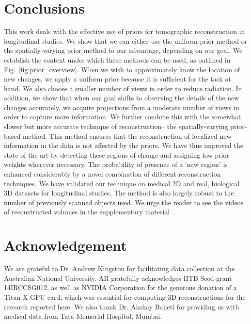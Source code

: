 \documentclass[journal]{IEEEtran}
\begin{document}
\section{Conclusions}
\label{sec:conclusions}
This work deals with the effective use of priors for tomographic
reconstruction in longitudinal studies. We show that we can either use
the uniform prior method or the spatially-varying prior method to our
advantage, depending on our goal. We establish the context under which
these methods can be used, as outlined in
Fig.~\ref{fig:prior_overview}. When we wish to approximately know the
location of new changes, we apply a uniform prior because it is
sufficient for the task at hand. We also choose a smaller number
of views in order to reduce radiation. In addition, we show that when
our goal shifts to observing the details of the new changes
accurately, we acquire projections from a moderate number of views in
order to capture more information. We further combine this with the
somewhat slower but more accurate technique of reconstruction-- the
spatially-varying prior-based method. This method ensures that the
reconstruction of localized new information in the data is not
affected by the priors. %
We have thus
improved the state of the art by detecting these regions of change and
assigning low prior weights wherever necessary. The probability of
presence of a `new region' is enhanced considerably by a novel
combination of different reconstruction techniques.  We have validated
our technique on medical 2D and real, biological 3D datasets for
longitudinal studies. The method is also largely robust to the number
of previously scanned objects used. We urge the reader to see the
videos of reconstructed volumes in the supplementary
material~\cite{supp_paper}.

\section{Acknowledgement}
We are grateful to Dr. Andrew Kingston for facilitating data
collection at the Australian National University. AR gratefully
acknowledges IITB Seed-grant 14IRCCSG012, as well as NVIDIA
Corporation for the generous donation of a Titan-X GPU card, which was
essential for computing 3D reconstructions for the research reported
here. We also thank Dr. Akshay Baheti for providing us with medical
data from Tata Memorial Hospital, Mumbai.
{%
}
\end{document}
